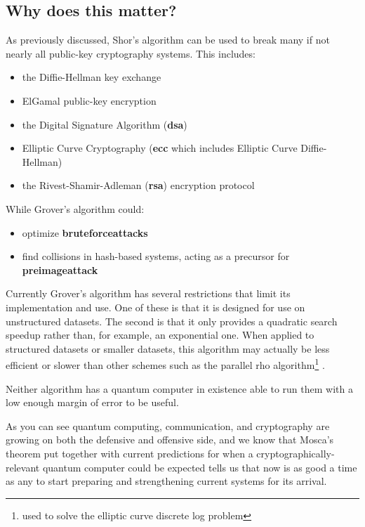     \subsection{Why does this matter?}
    As previously discussed, Shor's algorithm can be used to break many if not nearly all public-key cryptography systems. This includes:
    \begin{itemize}
        \item the Diffie-Hellman key exchange
        \item ElGamal public-key encryption
        \item the Digital Signature Algorithm (\textbf{\gls{dsa}})
        \item Elliptic Curve Cryptography (\textbf{\gls{ecc}} which includes Elliptic Curve Diffie-Hellman)
        \item the Rivest-Shamir-Adleman (\textbf{\gls{rsa}}) encryption protocol
    \end{itemize}

    While Grover's algorithm could:
    \begin{itemize}
        \item optimize \textbf{\glspl{bruteforceattack}}
        \item find collisions in hash-based systems, acting as a precursor for \textbf{\gls{preimageattack}}
    \end{itemize}

    Currently Grover's algorithm has several restrictions that limit its implementation and use. One of these is that it is designed for use on unstructured datasets. The second is that it only provides a quadratic search speedup rather than, for example, an exponential one. When applied to structured datasets or smaller datasets, this algorithm may actually be less efficient or slower than other schemes such as the parallel rho algorithm\footnote{used to solve the elliptic curve discrete log problem } \cite{gill_ecc}\cite{grover_no_adv}.

    Neither algorithm has a quantum computer in existence able to run them with a low enough margin of error to be useful.

    As you can see quantum computing, communication, and cryptography are growing on both the defensive and offensive side, and we know that Mosca's theorem put together with current predictions for when a cryptographically-relevant quantum computer could be expected tells us that now is as good a time as any to start preparing and strengthening current systems for its arrival. 